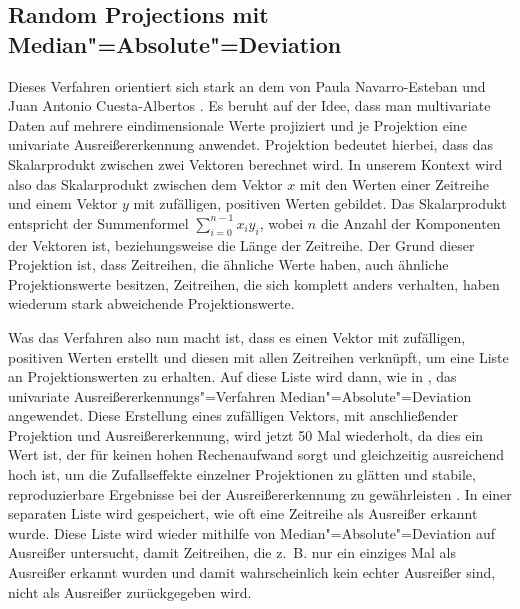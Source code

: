 \subsection{Random Projections mit Median"=Absolute"=Deviation}
Dieses Verfahren orientiert sich stark an dem von Paula Navarro-Esteban und Juan Antonio Cuesta-Albertos \cite{randomProjection}. Es beruht auf der Idee, dass man multivariate Daten auf mehrere eindimensionale Werte projiziert und je Projektion eine univariate Ausreißererkennung anwendet. Projektion bedeutet hierbei, dass das Skalarprodukt zwischen zwei Vektoren berechnet wird. In unserem Kontext wird also das Skalarprodukt zwischen dem Vektor $x$ mit den Werten einer Zeitreihe und einem Vektor $y$ mit zufälligen, positiven Werten gebildet. Das Skalarprodukt entspricht der Summenformel $\sum_{i=0}^{n-1} x_iy_i$, wobei $n$ die Anzahl der Komponenten der Vektoren ist, beziehungsweise die Länge der Zeitreihe. Der Grund dieser Projektion ist, dass Zeitreihen, die ähnliche Werte haben, auch ähnliche Projektionswerte besitzen, Zeitreihen, die sich komplett anders verhalten, haben wiederum stark abweichende Projektionswerte. 

Was das Verfahren also nun macht ist, dass es einen Vektor mit zufälligen, positiven Werten erstellt und diesen mit allen Zeitreihen verknüpft, um eine Liste an Projektionswerten zu erhalten. Auf diese Liste wird dann, wie in \cite[Ch. 3.3]{randomProjection}, das univariate Ausreißererkennungs"=Verfahren Median"=Absolute"=Deviation angewendet. Diese Erstellung eines zufälligen Vektors, mit anschließender Projektion und Ausreißererkennung, wird jetzt 50 Mal wiederholt, da dies ein Wert ist, der für keinen hohen Rechenaufwand sorgt und gleichzeitig ausreichend hoch ist, um die Zufallseffekte einzelner Projektionen zu glätten und stabile, reproduzierbare Ergebnisse bei der Ausreißererkennung zu gewährleisten \cite[Ch. 4.1]{randomProjection}. In einer separaten Liste wird gespeichert, wie oft eine Zeitreihe als Ausreißer erkannt wurde. Diese Liste wird wieder mithilfe von Median"=Absolute"=Deviation auf Ausreißer untersucht, damit Zeitreihen, die z.~B. nur ein einziges Mal als Ausreißer erkannt wurden und damit wahrscheinlich kein echter Ausreißer sind, nicht als Ausreißer zurückgegeben wird.

